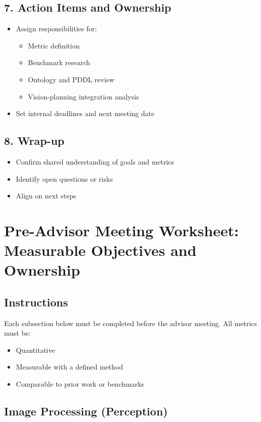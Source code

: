 \documentclass[12pt]{article}
\begin{document}
\subsection*{7. Action Items and Ownership}
\begin{itemize}
    \item Assign responsibilities for:
    \begin{itemize}
        \item Metric definition
        \item Benchmark research
        \item Ontology and PDDL review
        \item Vision-planning integration analysis
    \end{itemize}
    \item Set internal deadlines and next meeting date
\end{itemize}

\subsection*{8. Wrap-up}
\begin{itemize}
    \item Confirm shared understanding of goals and metrics
    \item Identify open questions or risks
    \item Align on next steps
\end{itemize}

\newpage
\section{Pre-Advisor Meeting Worksheet: Measurable Objectives and Ownership}

\subsection*{Instructions}
Each subsection below must be completed before the advisor meeting.
All metrics must be:
\begin{itemize}
    \item Quantitative
    \item Measurable with a defined method
    \item Comparable to prior work or benchmarks
\end{itemize}

\subsection{Image Processing (Perception)}
\end{document}
